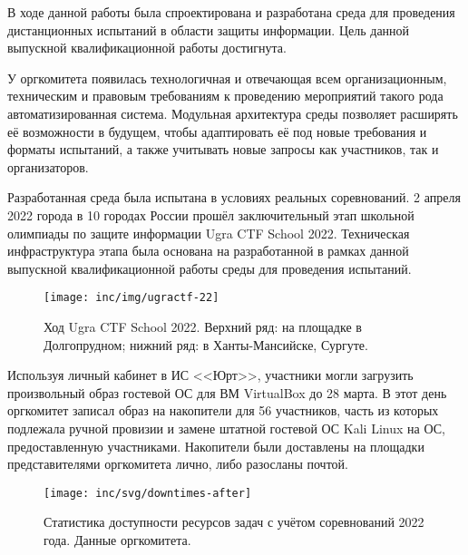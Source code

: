 \Conclusion

В ходе данной работы была спроектирована и разработана среда для проведения дистанционных испытаний в области защиты информации. Цель данной выпускной квалификационной работы достигнута.

У оргкомитета появилась технологичная и отвечающая всем организационным, техническим и правовым требованиям к проведению мероприятий такого рода автоматизированная система. Модульная архитектура среды позволяет расширять её возможности в будущем, чтобы адаптировать её под новые требования и форматы испытаний, а также учитывать новые запросы как участников, так и организаторов.

Разработанная среда была испытана в условиях реальных соревнований. 2 апреля 2022 города в 10 городах России прошёл заключительный этап школьной олимпиады по защите информации Ugra CTF School 2022. Техническая инфраструктура этапа была основана на разработанной в рамках данной выпускной квалификационной работы среды для проведения испытаний.

\begin{figure}[h!]
  \centering
  \texttt{[image: inc/img/ugractf-22]}
  \caption{Ход Ugra CTF School 2022. Верхний ряд: на площадке в Долгопрудном; нижний ряд: в Ханты-Мансийске, Сургуте.}
  \label{fig:Jeopardy}
\end{figure}

Используя личный кабинет в ИС <<Юрт>>, участники могли загрузить произвольный образ гостевой ОС для ВМ VirtualBox до 28 марта. В этот день оргкомитет записал образ на накопители для 56 участников, часть из которых подлежала ручной провизии и замене штатной гостевой ОС Kali Linux на ОС, предоставленную участниками. Накопители были доставлены на площадки представителями оргкомитета лично, либо разосланы почтой.


\begin{figure}[h!]
  \centering
  \texttt{[image: inc/svg/downtimes-after]}
  \caption{Статистика доступности ресурсов задач с учётом соревнований 2022 года. Данные оргкомитета.}
  \label{fig:downtimes-after}
\end{figure}

